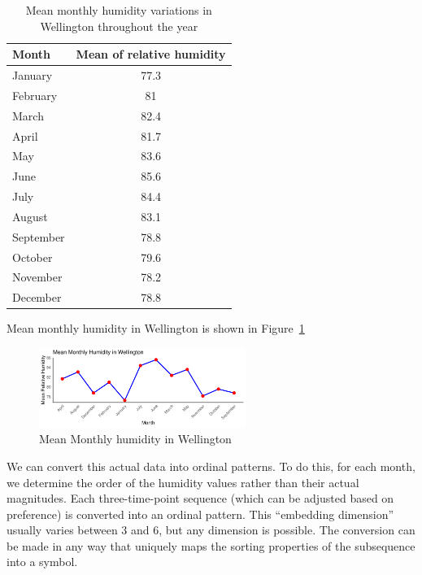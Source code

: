\begin{table}[hbt]
	\centering
	\begin{tabular}{lc}
		\toprule
		 Month & Mean of relative humidity \\
		\midrule
		January & 77.3 \\ 
		February & 81 \\
		March & 82.4 \\
		April & 81.7 \\
		May & 83.6 \\ 
		June & 85.6 \\
		July & 84.4 \\
		August & 83.1 \\ 
		September & 78.8 \\
		October & 79.6 \\
		November & 78.2 \\
		December & 78.8 \\
		\bottomrule
	\end{tabular}
	\caption{Mean monthly humidity variations in Wellington throughout the year}
	\label{tab:humidity}
\end{table}

Mean monthly humidity in Wellington is shown in Figure~\ref{fig:humidity}  
\begin{figure}[hbt]
	\centering
	\includegraphics[width=0.6\textwidth]{humidity graph}
	\caption{Mean Monthly humidity in Wellington}
	\label{fig:humidity}
\end{figure}

We can convert this actual data into ordinal patterns. 
To do this, for each month, we determine the order of the humidity values rather than their actual magnitudes. 
Each three-time-point sequence (which can be adjusted based on preference) is converted into an ordinal pattern.
This ``embedding dimension'' usually varies between $3$ and $6$, but any dimension is possible.
The conversion can be made in any way that uniquely maps the sorting properties of the subsequence into a symbol.


